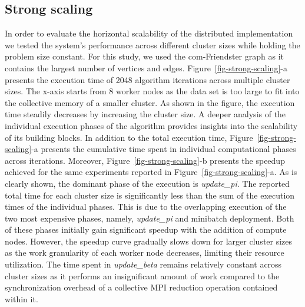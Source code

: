 \subsection{Strong scaling}

\begin{figure*}[t] %
  \centering
  \caption{(a) Execution time of 2048 algorithm iterations for the
  same problem size (com-Friendster, K=1024, M=16384 n=32) across different
  cluster sizes. (b) Speedup achieved for same experiments in (a) with respect to
  8 nodes}
  \label{fig-strong-scaling}
\end{figure*}

In order to evaluate the horizontal scalability of the distributed
implementation we tested the system's performance across different cluster
sizes while holding the problem size constant. For this study, we used the
com-Friendster graph as it contains the largest number of vertices and edges.
%
Figure~\ref{fig-strong-scaling}-a presents the execution time of 2048 algorithm
iterations across multiple cluster sizes. The x-axis starts from 8 worker nodes
as the data set is too large to fit into the collective memory of a smaller
cluster.
%
As shown in the figure, the execution
time steadily decreases by increasing the cluster size.
A deeper analysis of the individual execution phases of the algorithm provides
insights into the scalability of its building blocks.
%
In addition to the total execution time, Figure~\ref{fig-strong-scaling}-a
presents the cumulative time spent in individual computational phases across
iterations. Moreover, Figure~\ref{fig-strong-scaling}-b presents the speedup
achieved for the same experiments reported in
Figure~\ref{fig-strong-scaling}-a. As is clearly shown, the dominant phase of
the execution is \textit{update\_pi}.
The reported total time for each cluster size is significantly less than the
sum of the execution times of the individual phases. This is due to the
overlapping execution of the two most expensive phases, namely,
\textit{update\_pi} and
minibatch deployment. Both of these phases initially gain significant speedup with the
addition of compute nodes. However, the speedup curve gradually slows down for
larger cluster sizes as the work granularity of each worker node decreases,
limiting their resource utilization.
%
The time spent in \textit{update\_beta} remains relatively constant across cluster sizes
as it performs an insignificant amount of work compared to the synchronization
overhead of a collective MPI reduction operation contained within it.


